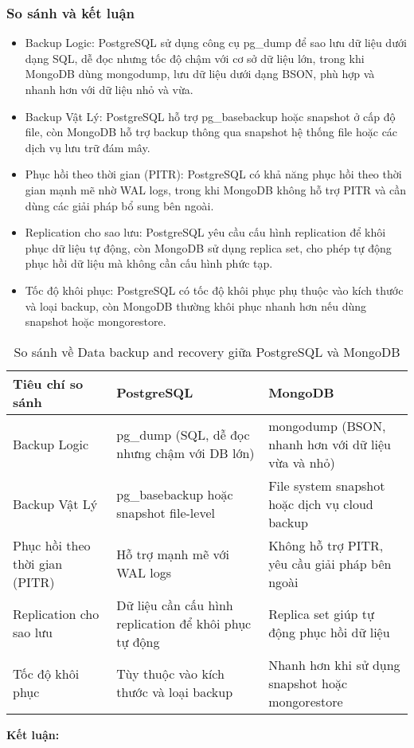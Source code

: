 \subsubsection{So sánh và kết luận}
\begin{itemize}
    \item Backup Logic: PostgreSQL sử dụng công cụ pg\_dump để sao lưu dữ liệu dưới dạng SQL, dễ đọc nhưng tốc độ chậm với cơ sở dữ liệu lớn, trong khi MongoDB dùng mongodump, lưu dữ liệu dưới dạng BSON, phù hợp và nhanh hơn với dữ liệu nhỏ và vừa.
    \item Backup Vật Lý: PostgreSQL hỗ trợ pg\_basebackup hoặc snapshot ở cấp độ file, còn MongoDB hỗ trợ backup thông qua snapshot hệ thống file hoặc các dịch vụ lưu trữ đám mây.
    \item Phục hồi theo thời gian (PITR): PostgreSQL có khả năng phục hồi theo thời gian mạnh mẽ nhờ WAL logs, trong khi MongoDB không hỗ trợ PITR và cần dùng các giải pháp bổ sung bên ngoài.
    \item Replication cho sao lưu: PostgreSQL yêu cầu cấu hình replication để khôi phục dữ liệu tự động, còn MongoDB sử dụng replica set, cho phép tự động phục hồi dữ liệu mà không cần cấu hình phức tạp.
    \item Tốc độ khôi phục: PostgreSQL có tốc độ khôi phục phụ thuộc vào kích thước và loại backup, còn MongoDB thường khôi phục nhanh hơn nếu dùng snapshot hoặc mongorestore.
\end{itemize}
\begin{table}[H]
    \centering
    \begin{tabular}{|L{3.2cm}|L{5.05cm}|L{5.05cm}|} \hline 
         \textbf{Tiêu chí so sánh }&  \textbf{PostgreSQL}&  \textbf{MongoDB}\\ \hline 
         Backup Logic & pg\_dump (SQL, dễ đọc nhưng chậm với DB lớn) & mongodump (BSON, nhanh hơn với dữ liệu vừa và nhỏ)\\ \hline 
         Backup Vật Lý & pg\_basebackup hoặc snapshot file-level & File system snapshot hoặc dịch vụ cloud backup\\ \hline 
         Phục hồi theo thời gian (PITR) & Hỗ trợ mạnh mẽ với WAL logs & Không hỗ trợ PITR, yêu cầu giải pháp bên ngoài\\ \hline 
         Replication cho sao lưu & Dữ liệu cần cấu hình replication để khôi phục tự động & Replica set giúp tự động phục hồi dữ liệu\\ \hline 
         Tốc độ khôi phục & Tùy thuộc vào kích thước và loại backup & Nhanh hơn khi sử dụng snapshot hoặc mongorestore\\ \hline
    \end{tabular}
    \caption{So sánh về Data backup and recovery giữa PostgreSQL và MongoDB}
    \label{tab:data_backup_and_recovery}
\end{table}
\indent \textbf{Kết luận:}
\newpage
